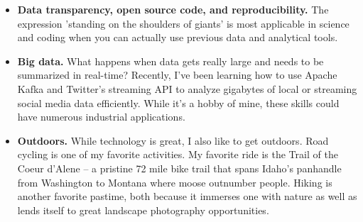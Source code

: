 \documentclass[11pt,a4paper,sans]{moderncv}        %
\begin{document}
\begin{itemize}

\item{\textbf{Data transparency, open source code, and reproducibility.} The expression 'standing on the shoulders of giants' is most applicable in science and coding when you can actually use previous data and analytical tools.}

\vspace{6pt}

\item{\textbf{Big data.} What happens when data gets really large and needs to be summarized in real-time? Recently, I've been learning how to use Apache Kafka and Twitter's streaming API to analyze gigabytes of local or streaming social media data efficiently. While it's a hobby of mine, these skills could have numerous industrial applications.}

\vspace{6pt}

\item{\textbf{Outdoors.} While technology is great, I also like to get outdoors. Road cycling is one of my favorite activities. My favorite ride is the Trail of the Coeur d'Alene -- a pristine 72 mile bike trail that spans Idaho's panhandle from Washington to Montana where moose outnumber people. Hiking is another favorite pastime, both because it immerses one with nature as well as lends itself to great landscape photography opportunities.}



\end{itemize}


 


\end{document}
